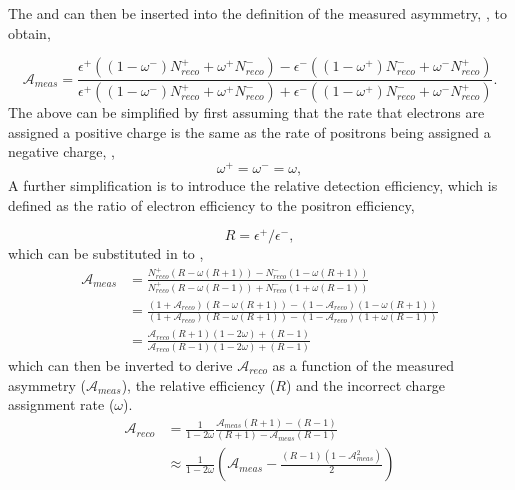 The  and  can then be inserted
into the definition of the measured asymmetry, , to obtain,

\begin{equation}
\label{eq:meas1}
\mathcal{A}_{meas} = \frac{
  \epsilon^+ ( ( 1 - \omega^- ) N_{reco}^{+} + \omega^+ N_{reco}^{-} ) -
  \epsilon^- ( ( 1 - \omega^+ ) N_{reco}^{-} + \omega^- N_{reco}^{+} )
}
{
  \epsilon^+ ( ( 1 - \omega^- ) N_{reco}^{+} + \omega^+ N_{reco}^{-} ) +
  \epsilon^- ( ( 1 - \omega^+ ) N_{reco}^{-} + \omega^- N_{reco}^{+} )
} .
\end{equation}
The above can be simplified by first assuming that the rate that
electrons are assigned a positive charge is the same as the rate of positrons
being assigned a negative charge, \ie,
\begin{equation}
  \omega^{+} = \omega^{-} = \omega ,
\end{equation}
A further simplification is to introduce the relative detection efficiency,
which is defined as the ratio of electron efficiency to the positron efficiency,

\begin{equation}
 R = \epsilon^+/\epsilon^- ,
\end{equation}
which can be substituted in to ,
\begin{align}
\mathcal{A}_{meas} 
&= \frac{
  N_{reco}^{+} (R - \omega(R+1)) -
  N_{reco}^{-} (1 - \omega(R+1))
}
{
  N_{reco}^{+} (R - \omega(R-1)) +
  N_{reco}^{-} (1 + \omega(R-1))
}\\
&= \frac{
  (1+\mathcal{A}_{reco}) (R - \omega(R+1)) -
  (1-\mathcal{A}_{reco}) (1 - \omega(R+1))
}
{
  (1+\mathcal{A}_{reco}) (R - \omega(R+1)) -
  (1-\mathcal{A}_{reco}) (1 + \omega(R-1))
}\\
&= \frac{
  \mathcal{A}_{reco} (R + 1)(1 - 2 \omega) + (R - 1)
}
{
  \mathcal{A}_{reco} (R - 1)(1 - 2 \omega) + (R - 1)
}
\end{align}
which can then be inverted to derive $\mathcal{A}_{reco}$ as a function of the
measured asymmetry ($\mathcal{A}_{meas}$), the relative efficiency ($R$) and the
incorrect charge assignment rate ($\omega$).
\begin{align}
\mathcal{A}_{reco}
&=\frac{1}{1-2\omega}
  \frac{
    \mathcal{A}_{meas} (R + 1) - (R-1)
  }
  {
    (R + 1) - \mathcal{A}_{meas} (R-1)
  }\\
&\approx \frac{1}{1-2\omega}
\left(
  \mathcal{A}_{meas} -
\frac{ (R - 1)(1 - \mathcal{A}_{meas}^{2}) } { 2 }
\right)
\end{align}

